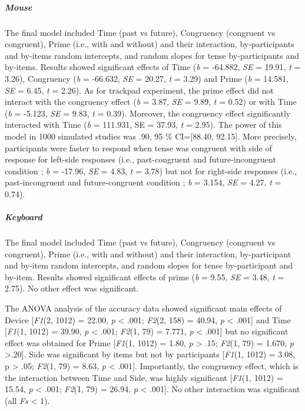 \documentclass[
  a4paper,12pt,twoside,onecolumn,openright,final,oldfontcommands]{memoir}
\begin{document}
\hypertarget{mouse}{%
\subparagraph{Mouse}\label{mouse}}

The final model included Time (past vs future), Congruency (congruent vs congruent), Prime (i.e., with and without) and their interaction, by-participants and by-items random intercepts, and random slopes for tense by-participants and by-items. Results showed significant effects of Time (\emph{b} = -64.882, \emph{SE} = 19.91, \emph{t} = 3.26), Congruency (\emph{b} = -66.632, \emph{SE} = 20.27, \emph{t} = 3.29) and Prime (\emph{b} = 14.581, \emph{SE} = 6.45, \emph{t} = 2.26). As for trackpad experiment, the prime effect did not interact with the congruency effect (\emph{b} = 3.87, \emph{SE} = 9.89, \emph{t} = 0.52) or with Time (\emph{b} = -5.123, \emph{SE} = 9.83, \emph{t} = 0.39). Moreover, the congruency effect significantly interacted with Time (\emph{b} = 111.931, SE = 37.93, \emph{t} = 2.95). The power of this model in 1000 simulated studies was .90, 95 \% CI={[}88.40, 92.15{]}. More precisely, participants were faster to respond when tense was congruent with side of response for left-side responses (i.e., past-congruent and future-incongruent condition ; \emph{b} = -17.96, \emph{SE} = 4.83, \emph{t} = 3.78) but not for right-side responses (i.e., past-incongruent and future-congruent condition ; \emph{b} = 3.154, \emph{SE} = 4.27, \emph{t} = 0.74).

\hypertarget{keyboard}{%
\subparagraph{Keyboard}\label{keyboard}}

The final model included Time (past vs future), Congruency (congruent vs congruent), Prime (i.e., with and without) and their interaction, by-participant and by-item random intercepts, and random slopes for tense by-participant and by-item. Results showed significant effects of prime (\emph{b} = 9.55, \emph{SE} = 3.48, \emph{t} = 2.75). No other effect was significant.

The ANOVA analysis of the accuracy data showed significant main effects of Device {[}\emph{F1}(2, 1012) = 22.00, \emph{p} \textless{} .001; \emph{F2}(2, 158) = 40.94, \emph{p} \textless{} .001{]} and Time {[}\emph{F1}(1, 1012) = 39.90, \emph{p} \textless{} .001; \emph{F2}(1, 79) = 7.771, \emph{p} \textless{} .001{]} but no significant effect was obtained for Prime {[}\emph{F1}(1, 1012) = 1.80, \emph{p} \textgreater{} .15; \emph{F2}(1, 79) = 1.670, \emph{p} \textgreater.20{]}. Side was significant by items but not by participants {[}\emph{F1}(1, 1012) = 3.08, p \textgreater{} .05; \emph{F2}(1, 79) = 8.63, \emph{p} \textless{} .001{]}. Importantly, the congruency effect, which is the interaction between Time and Side, was highly significant {[}\emph{F1}(1, 1012) = 15.54, \emph{p} \textless{} .001; \emph{F2}(1, 79) = 26.94, \emph{p} \textless{} .001{]}. No other interaction was significant (all \emph{Fs} \textless{} 1).
\end{document}
